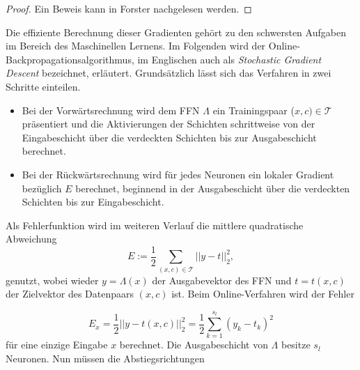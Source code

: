 \begin{proof}
    Ein Beweis kann in Forster\cite{forster2017analysis} nachgelesen werden.
\end{proof}
Die effiziente Berechnung dieser Gradienten gehört zu den schwersten Aufgaben\cite{DBLP:series/lncs/LeCunBOM12} im Bereich des Maschinellen Lernens.
Im Folgenden wird der Online-Backpropagationsalgorithmus, im Englischen auch als \textit{Stochastic Gradient Descent} bezeichnet, erläutert. Grundsätzlich lässt sich das Verfahren in zwei Schritte einteilen.

\begin{itemize}
    \item Bei der Vorwärtsrechnung wird dem FFN $\Lambda$ ein Trainingspaar ($x,c) \in \mathcal{T}$ präsentiert und die Aktivierungen der Schichten schrittweise von der Eingabeschicht über die verdeckten Schichten bis zur Ausgabeschicht berechnet.
    \item Bei der Rückwärtsrechnung wird für jedes Neuronen ein lokaler Gradient bezüglich $E$ berechnet, beginnend in der Ausgabeschicht über die verdeckten Schichten bis zur Eingabeschicht.
\end{itemize}
Als Fehlerfunktion wird im weiteren Verlauf die mittlere quadratische Abweichung 
\begin{equation}
    \label{eq:MSE}
    E:=\frac{1}{2} \sum_{(x,c) \in \mathcal{T}} ||y-t||_2^2,
\end{equation}
genutzt, wobei wieder $y=\Lambda(x)$ der Ausgabevektor des FFN und $t=t(x,c)$ der Zielvektor des Datenpaars $(x,c)$ ist. Beim Online-Verfahren wird der Fehler 

\begin{equation}
    \label{eq:MSE_single}
    E_x= \frac{1}{2} ||y-t(x,c)||_2^2= \frac{1}{2} \sum_{k=1}^{s_l} (y_k-t_k)^2
\end{equation}
für eine einzige Eingabe $x$ berechnet. Die Ausgabeschicht von $\Lambda$ besitze $s_l$ Neuronen. Nun müssen die Abstiegsrichtungen 

